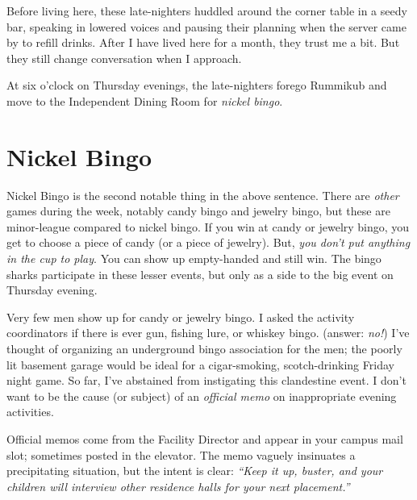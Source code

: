 \documentclass[
  letterpaper,
  DIV=11,
  numbers=noendperiod]{scrreprt}
\begin{document}
Before living here, these late-nighters huddled around the corner table
in a seedy bar, speaking in lowered voices and pausing their planning
when the server came by to refill drinks. After I have lived here for a
month, they trust me a bit. But they still change conversation when I
approach.

At six o'clock on Thursday evenings, the late-nighters forego Rummikub
and move to the Independent Dining Room for \emph{nickel bingo}.

\section*{Nickel Bingo}\label{nickel-bingo-1}


Nickel Bingo is the second notable thing in the above sentence. There
are \emph{other} games during the week, notably candy bingo and jewelry
bingo, but these are minor-league compared to nickel bingo. If you win
at candy or jewelry bingo, you get to choose a piece of candy (or a
piece of jewelry). But, \emph{you don't put anything in the cup to
play}. You can show up empty-handed and still win. The bingo sharks
participate in these lesser events, but only as a side to the big event
on Thursday evening.

Very few men show up for candy or jewelry bingo. I asked the activity
coordinators if there is ever gun, fishing lure, or whiskey bingo.
(answer: \emph{no!}) I've thought of organizing an underground bingo
association for the men; the poorly lit basement garage would be ideal
for a cigar-smoking, scotch-drinking Friday night game. So far, I've
abstained from instigating this clandestine event. I don't want to be
the cause (or subject) of an \emph{official memo} on inappropriate
evening activities.

\begin{tcolorbox}[enhanced jigsaw, left=2mm, colbacktitle=quarto-callout-note-color!10!white, arc=.35mm, titlerule=0mm, leftrule=.75mm, colframe=quarto-callout-note-color-frame, breakable, toprule=.15mm, coltitle=black, rightrule=.15mm, opacityback=0, toptitle=1mm, opacitybacktitle=0.6, bottomtitle=1mm, title={Official Memos}, colback=white, bottomrule=.15mm]

Official memos come from the Facility Director and appear in your campus
mail slot; sometimes posted in the elevator. The memo vaguely insinuates
a precipitating situation, but the intent is clear: \emph{``Keep it up,
buster, and your children will interview other residence halls for your
next placement.''}

\end{tcolorbox}
\end{document}

